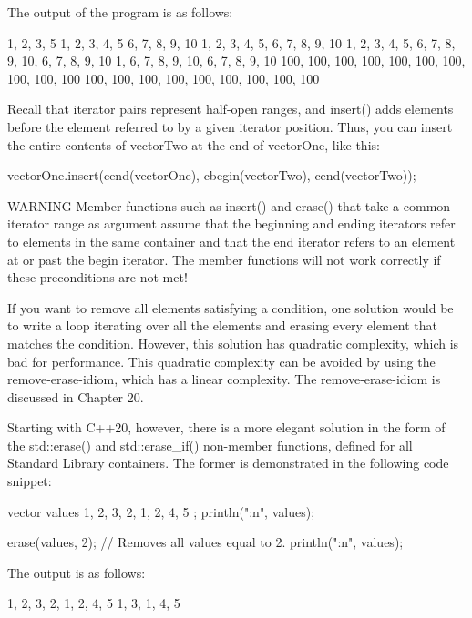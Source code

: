 The output of the program is as follows:

\begin{shell}
1, 2, 3, 5
1, 2, 3, 4, 5
6, 7, 8, 9, 10
1, 2, 3, 4, 5, 6, 7, 8, 9, 10
1, 2, 3, 4, 5, 6, 7, 8, 9, 10, 6, 7, 8, 9, 10
1, 6, 7, 8, 9, 10, 6, 7, 8, 9, 10
100, 100, 100, 100, 100, 100, 100, 100, 100, 100
100, 100, 100, 100, 100, 100, 100, 100, 100
\end{shell}

Recall that iterator pairs represent half-open ranges, and insert() adds elements before the element referred to by a given iterator position. Thus, you can insert the entire contents of vectorTwo at the end of vectorOne, like this:

\begin{cpp}
vectorOne.insert(cend(vectorOne), cbegin(vectorTwo), cend(vectorTwo));
\end{cpp}

\begin{myWarning}{WARNING}
Member functions such as insert() and erase() that take a common iterator range as argument assume that the beginning and ending iterators refer to elements in the same container and that the end iterator refers to an element at or past the begin iterator. The member functions will not work correctly if these preconditions are not met!
\end{myWarning}

If you want to remove all elements satisfying a condition, one solution would be to write a loop iterating over all the elements and erasing every element that matches the condition. However, this solution has quadratic complexity, which is bad for performance. This quadratic complexity can be avoided by using the remove-erase-idiom, which has a linear complexity. The remove-erase-idiom is discussed in Chapter 20.

Starting with C++20, however, there is a more elegant solution in the form of the std::erase() and std::erase\_if() non-member functions, defined for all Standard Library containers. The former is demonstrated in the following code snippet:

\begin{cpp}
vector values { 1, 2, 3, 2, 1, 2, 4, 5 };
println("{:n}", values);

erase(values, 2); // Removes all values equal to 2.
println("{:n}", values);
\end{cpp}

The output is as follows:

\begin{shell}
1, 2, 3, 2, 1, 2, 4, 5
1, 3, 1, 4, 5
\end{shell}

